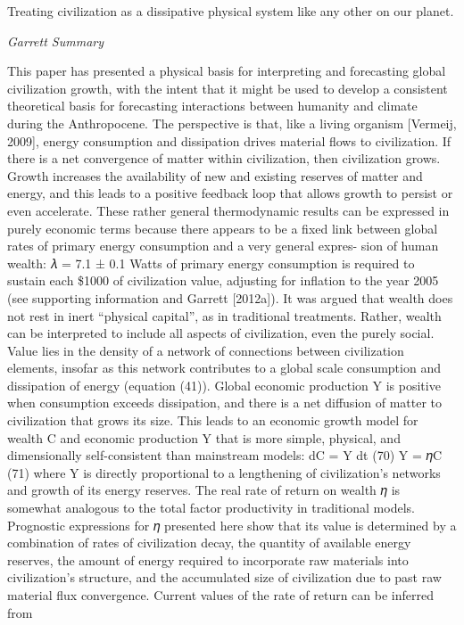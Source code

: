 \documentclass[
]{book}
\begin{document}
Treating civilization as a dissipative physical system like any other on our planet.

\emph{Garrett Summary}

This paper has presented a physical basis for interpreting and forecasting global civilization growth, with
the intent that it might be used to develop a consistent theoretical basis for forecasting interactions
between humanity and climate during the Anthropocene.
The perspective is that, like a living organism {[}Vermeij, 2009{]}, energy consumption and dissipation drives
material ﬂows to civilization. If there is a net convergence of matter within civilization, then civilization
grows. Growth increases the availability of new and existing reserves of matter and energy, and this leads
to a positive feedback loop that allows growth to persist or even accelerate.
These rather general thermodynamic results can be expressed in purely economic terms because there
appears to be a ﬁxed link between global rates of primary energy consumption and a very general expres-
sion of human wealth: 𝜆 = 7.1 ± 0.1 Watts of primary energy consumption is required to sustain each
\$1000 of civilization value, adjusting for inﬂation to the year 2005 (see supporting information and Garrett
{[}2012a{]}).
It was argued that wealth does not rest in inert ``physical capital'', as in traditional treatments. Rather,
wealth can be interpreted to include all aspects of civilization, even the purely social. Value lies in the
density of a network of connections between civilization elements, insofar as this network contributes
to a global scale consumption and dissipation of energy (equation (41)). Global economic production Y is
positive when consumption exceeds dissipation, and there is a net diﬀusion of matter to civilization that
grows its size.
This leads to an economic growth model for wealth C and economic production Y that is more simple,
physical, and dimensionally self-consistent than mainstream models:
dC
= Y
dt (70)
Y = 𝜂C (71)
where Y is directly proportional to a lengthening of civilization's networks and growth of its energy
reserves. The real rate of return on wealth 𝜂 is somewhat analogous to the total factor productivity in
traditional models. Prognostic expressions for 𝜂 presented here show that its value is determined by a
combination of rates of civilization decay, the quantity of available energy reserves, the amount of energy
required to incorporate raw materials into civilization's structure, and the accumulated size of civilization
due to past raw material ﬂux convergence. Current values of the rate of return can be inferred from
\end{document}
